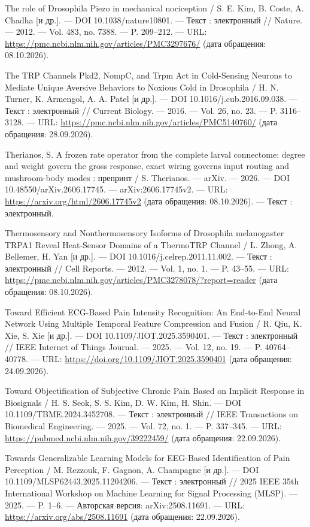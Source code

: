\begin{list}{}{\setlength{\leftmargin}{10mm}\setlength{\labelwidth}{8mm}\setlength{\labelsep}{2mm}\setlength{\itemsep}{0pt}\setlength{\parsep}{0pt}\setlength{\topsep}{0pt}}
\item[279.] The role of Drosophila Piezo in mechanical nociception / S. E. Kim, B. Coste, A. Chadha [и др.]. — DOI 10.1038/nature10801. — Текст : электронный // Nature. — 2012. — Vol. 483, no. 7388. — P. 209–212. — URL: \url{https://pmc.ncbi.nlm.nih.gov/articles/PMC3297676/} (дата обращения: 08.10.2026).
\item[280.] The TRP Channels Pkd2, NompC, and Trpm Act in Cold-Sensing Neurons to Mediate Unique Aversive Behaviors to Noxious Cold in Drosophila / H. N. Turner, K. Armengol, A. A. Patel [и др.]. — DOI 10.1016/j.cub.2016.09.038. — Текст : электронный // Current Biology. — 2016. — Vol. 26, no. 23. — P. 3116–3128. — URL: \url{https://pmc.ncbi.nlm.nih.gov/articles/PMC5140760/} (дата обращения: 28.09.2026).
\item[281.] Therianos, S. A frozen rate operator from the complete larval connectome: degree and weight govern the gross response, exact wiring governs input routing and mushroom-body modes : препринт / S. Therianos. — arXiv. — 2026. — DOI 10.48550/arXiv.2606.17745. — arXiv:2606.17745v2. — URL: \url{https://arxiv.org/html/2606.17745v2} (дата обращения: 08.10.2026). — Текст : электронный.
\item[282.] Thermosensory and Nonthermosensory Isoforms of Drosophila melanogaster TRPA1 Reveal Heat-Sensor Domains of a ThermoTRP Channel / L. Zhong, A. Bellemer, H. Yan [и др.]. — DOI 10.1016/j.celrep.2011.11.002. — Текст : электронный // Cell Reports. — 2012. — Vol. 1, no. 1. — P. 43–55. — URL: \url{https://pmc.ncbi.nlm.nih.gov/articles/PMC3278078/?report=reader} (дата обращения: 08.10.2026).
\item[283.] Toward Efficient ECG-Based Pain Intensity Recognition: An End-to-End Neural Network Using Multiple Temporal Feature Compression and Fusion / R. Qiu, K. Xie, S. Xie [и др.]. — DOI 10.1109/JIOT.2025.3590401. — Текст : электронный // IEEE Internet of Things Journal. — 2025. — Vol. 12, no. 19. — P. 40764–40778. — URL: \url{https://doi.org/10.1109/JIOT.2025.3590401} (дата обращения: 24.09.2026).
\item[284.] Toward Objectification of Subjective Chronic Pain Based on Implicit Response in Biosignals / H. S. Seok, S. S. Kim, D. W. Kim, H. Shin. — DOI 10.1109/TBME.2024.3452708. — Текст : электронный // IEEE Transactions on Biomedical Engineering. — 2025. — Vol. 72, no. 1. — P. 337–345. — URL: \url{https://pubmed.ncbi.nlm.nih.gov/39222459/} (дата обращения: 22.09.2026).
\item[285.] Towards Generalizable Learning Models for EEG-Based Identification of Pain Perception / M. Rezzouk, F. Gagnon, A. Champagne [и др.]. — DOI 10.1109/MLSP62443.2025.11204206. — Текст : электронный // 2025 IEEE 35th International Workshop on Machine Learning for Signal Processing (MLSP). — 2025. — P. 1–6. — Авторская версия: arXiv:2508.11691. — URL: \url{https://arxiv.org/abs/2508.11691} (дата обращения: 22.09.2026).

\end{list}
